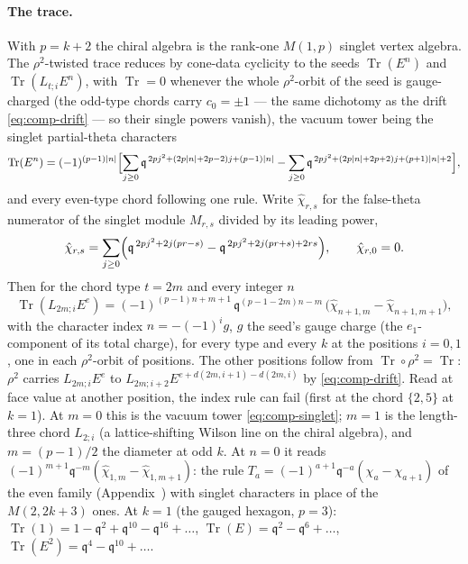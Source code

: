 \documentclass[11pt]{amsart}
\makeatletter
\DeclareMathOperator{\Tr}{Tr}
\newcommand\fq{\mathfrak{q}}
\theoremstyle{remark}
\newcommand{\pref}[1]{\@ifundefined{r@P-#1}{\textup{[\texttt{\detokenize{#1}}]}}{\ref{P-#1}}}
\makeatother
\begin{document}
\paragraph{The trace.}  With $p=k+2$ the chiral algebra is the rank-one
$M(1,p)$ singlet vertex algebra.  The $\rho^2$-twisted trace reduces by
cone-data cyclicity to the seeds $\Tr(E^n)$ and $\Tr(L_{t;i}E^n)$, with
$\Tr=0$ whenever the whole $\rho^2$-orbit of the seed is gauge-charged
(the odd-type chords carry $c_0=\pm1$ --- the same dichotomy as the drift
\eqref{eq:comp-drift} --- so their single powers vanish),
the vacuum tower being the singlet partial-theta characters
\begin{equation}\label{eq:comp-singlet}
  \Tr(E^n)=(-1)^{(p-1)|n|}\Bigl[\sum_{j\ge0}\fq^{\,2pj^2+(2p|n|+2p-2)j+(p-1)|n|}
  -\sum_{j\ge0}\fq^{\,2pj^2+(2p|n|+2p+2)j+(p+1)|n|+2}\Bigr],
\end{equation}
and every even-type chord following one rule.  Write $\hat\chi_{r,s}$ for the
false-theta numerator of the singlet module $M_{r,s}$ divided by its leading
power,
\begin{equation}
  \hat\chi_{r,s}=\sum_{j\ge0}\Bigl(\fq^{\,2pj^2+2j(pr-s)}-\fq^{\,2pj^2+2j(pr+s)+2rs}\Bigr),
  \qquad \hat\chi_{r,0}=0 .
\end{equation}
Then for the chord type $t=2m$ and every integer $n$
\begin{equation}\label{eq:comp-longchord}
  \Tr(L_{2m;i}E^{e})=(-1)^{(p-1)n+m+1}\,\fq^{(p-1-2m)n-m}\,
  \bigl(\hat\chi_{n+1,m}-\hat\chi_{n+1,m+1}\bigr),
\end{equation}
with the character index $n=-(-1)^ig$, $g$ the seed's gauge charge (the
$e_1$-component of its total charge), for every type and every $k$ at the
positions $i=0,1$, one in each $\rho^2$-orbit of positions.  The other
positions follow from $\Tr\circ\rho^2=\Tr$: $\rho^2$ carries
$L_{2m;i}E^e$ to $L_{2m;i+2}E^{e+d(2m,i+1)-d(2m,i)}$ by \eqref{eq:comp-drift}.
Read at face value at another position, the index rule can fail (first at the
chord $\{2,5\}$ at $k=1$).  At $m=0$
this is the vacuum tower \eqref{eq:comp-singlet}; $m=1$ is the length-three
chord $L_{2;i}$ (a lattice-shifting Wilson line on the chiral algebra), and
$m=(p-1)/2$ the diameter at odd $k$.  At $n=0$ it reads
$(-1)^{m+1}\fq^{-m}(\hat\chi_{1,m}-\hat\chi_{1,m+1})$: the rule
$T_a=(-1)^{a+1}\fq^{-a}(\chi_a-\chi_{a+1})$ of the even family
(Appendix~\pref{app:a1a2k}) with singlet characters in place of the
$M(2,2k+3)$ ones.  At $k=1$ (the gauged hexagon, $p=3$): $\Tr(1)=1-\fq^2+\fq^{10}-\fq^{16}+\dots$,
$\Tr(E)=\fq^2-\fq^6+\dots$, $\Tr(E^2)=\fq^4-\fq^{10}+\dots$.
\end{document}
